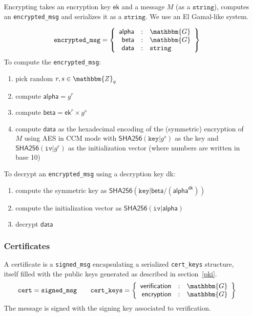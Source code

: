 \documentclass[a4paper]{article}
\newcommand{\G}{\mathbbm{G}}
\newcommand{\Z}{\mathbbm{Z}}
\newcommand{\jstring}{\texttt{string}}
\begin{document}
Encrypting takes an encryption key $\textsf{ek}$ and a message $M$ (as
a $\jstring$), computes an \texttt{encrypted\_msg} and serializes it
as a $\jstring$. We use an El Gamal-like system.

\begin{gather*}
  \texttt{encrypted\_msg}=\left\{
    \begin{array}{rcl}
      \textsf{alpha}&:&\G\\
      \textsf{beta}&:&\G\\
      \textsf{data}&:&\jstring
    \end{array}
  \right\}
\end{gather*}
To compute the \texttt{encrypted\_msg}:
\begin{enumerate}
\item pick random $r,s\in\Z_q$
\item compute $\textsf{alpha}=g^r$
\item compute $\textsf{beta}=\textsf{ek}^r\times g^s$
\item compute $\textsf{data}$ as the hexadecimal encoding of the (symmetric)
  encryption of $M$ using AES in CCM mode with
  $\textsf{SHA256}(\texttt{key|}g^s)$ as the key and $\textsf{SHA256}(\texttt{iv|}g^r)$ as the
  initialization vector (where numbers are written in base 10)
\end{enumerate}
To decrypt an \texttt{encrypted\_msg} using a decryption key \textsf{dk}:
\begin{enumerate}
\item compute the symmetric key as $\textsf{SHA256}(\texttt{key|}\textsf{beta}/(\textsf{alpha}^{\textsf{dk}}))$
\item compute the initialization vector as $\textsf{SHA256}(\texttt{iv|}\textsf{alpha})$
\item decrypt $\textsf{data}$
\end{enumerate}

\subsubsection{Certificates}
\label{certificates}

A certificate is a \texttt{signed\_msg} encapsulating a serialized
\texttt{cert\_keys} structure, itself filled with the public keys
generated as described in section~\ref{pki}.
\begin{gather*}
  \texttt{cert}=\texttt{signed\_msg}
  \qquad
  \texttt{cert\_keys}=\left\{
    \begin{array}{rcl}
      \textsf{verification}&:&\G\\
      \textsf{encryption}&:&\G
    \end{array}
  \right\}
\end{gather*}
The message is signed with the signing key associated to
\textsf{verification}.
\end{document}

